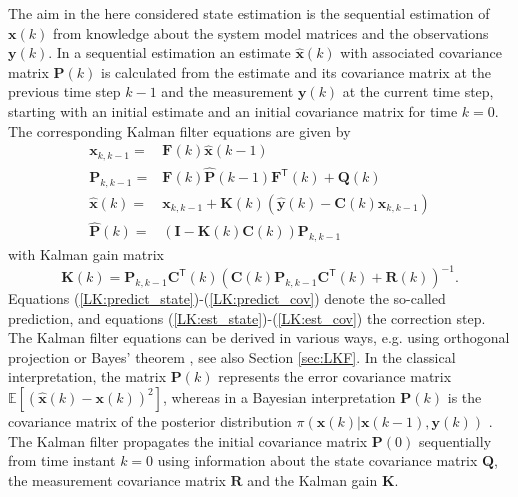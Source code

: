 \documentclass[10pt]{article}
\begin{document}
\begin{spacing}{1}
The aim in the here considered state estimation is the sequential estimation of $\bm{x}(k)$ from knowledge about the system model matrices and the observations $\bm{y}(k)$. In a sequential estimation an estimate $\hat{\bm{x}}(k)$ with associated covariance matrix $\bm{P}(k)$ is calculated from the estimate and its covariance matrix at the previous time step $k-1$ and the measurement $\bm{y}(k)$ at the current time step, starting with an initial estimate and an initial covariance matrix for time $k=0$. The corresponding Kalman filter equations are given by \cite{Kalman}
\begin{align}
	\bm{x}_{k,k-1} =& \bm{F}(k)\hat{\bm{x}}(k-1) \label{LK:predict_state}\\
	\bm{P}_{k,k-1} =& \bm{F}(k)\hat{\bm{P}}(k-1)\bm{F}^{\mathsf{T}}(k)+\bm{Q}(k) \label{LK:predict_cov}\\
	\hat{\bm{x}}(k) =& \bm{x}_{k,k-1} + \bm{K}(k) \left( \hat{\bm{y}}(k) - \bm{C}(k)\bm{x}_{k,k-1} \right) \label{LK:est_state} \\
	\hat{\bm{P}}(k) =& \left( \bm{I} - \bm{K}(k)\bm{C}(k)\right)\bm{P}_{k,k-1} \label{LK:est_cov}
\end{align}
with Kalman gain matrix
\begin{equation}
	\bm{K}(k) = \bm{P}_{k,k-1}\bm{C}^{\mathsf{T}}(k) \left( \bm{C}(k)\bm{P}_{k,k-1}\bm{C}^{\mathsf{T}}(k) + \bm{R}(k) \right)^{-1} .
\label{LK:gain}
\end{equation}
Equations (\ref{LK:predict_state})-(\ref{LK:predict_cov}) denote the so-called prediction, and equations (\ref{LK:est_state})-(\ref{LK:est_cov}) the correction step. The Kalman filter equations can be derived in various ways, e.g. using orthogonal projection \cite{Kalman} or Bayes' theorem \cite{Candy}, see also Section \ref{sec:LKF}. In the classical interpretation, the matrix $\bm{P}(k)$ represents the error covariance matrix $\mathbb{E} \left[ (\hat{\bm{x}}(k)-\bm{x}(k))^2 \right]$, whereas in a Bayesian interpretation $\bm{P}(k)$ is the covariance matrix of the posterior distribution $\pi(\bm{x}(k)\vert \bm{x}(k-1),\bm{y}(k))$ \cite{Candy}. 
The Kalman filter propagates the initial covariance matrix $\bm{P}(0)$ sequentially from time instant $k=0$ using information about the state covariance matrix $\bm{Q}$, the measurement covariance matrix $\bm{R}$ and the Kalman gain $\bm{K}$. 


\end{spacing}
\end{document}
